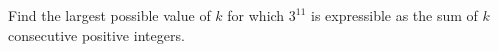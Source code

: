 Find the largest possible value of $k$ for which $3^{11}$ is expressible as the sum of $k$ consecutive positive integers.